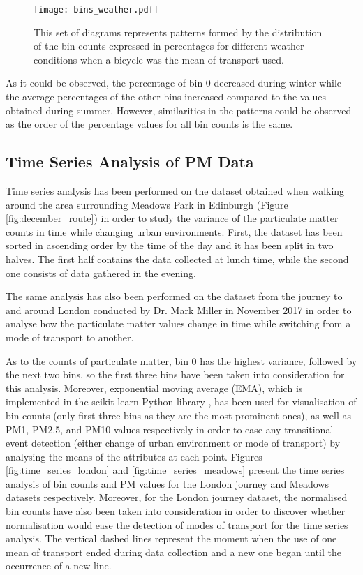 \documentclass[bsc,frontabs,twoside,singlespacing, parskip,deptreport]{infthesis}     %
\begin{document}
\begin{figure}[h!]
  \center
  \texttt{[image: bins\_weather.pdf]} 
  \caption{This set of diagrams represents patterns formed by the distribution of the bin counts expressed in percentages for different weather conditions when a bicycle was the mean of transport used.}
  \label{fig:bins_weather}
\end{figure}

As it could be observed, the percentage of bin 0 decreased during winter while the average percentages of the other bins increased compared to the values obtained during summer. However, similarities in the patterns could be observed as the order of the percentage values for all bin counts is the same.

\subsection{Time Series Analysis of PM Data}

Time series analysis has been performed on the dataset obtained when walking around the area surrounding Meadows Park in Edinburgh (Figure \ref{fig:december_route}) in order to study the variance of the particulate matter counts in time while changing urban environments. First, the dataset has been sorted in ascending order by the time of the day and it has been split in two halves. The first half contains the data collected at lunch time, while the second one consists of data gathered in the evening.

The same analysis has also been performed on the dataset from the journey to and around London conducted by Dr. Mark Miller in November 2017 in order to analyse how the particulate matter values change in time while switching from a mode of transport to another.

As to the counts of particulate matter, bin 0 has the highest variance, followed by the next two bins, so the first three bins have been taken into consideration for this analysis. Moreover, exponential moving average (EMA), which is implemented in the scikit-learn Python library \cite{scikit-learn}, has been used for visualisation of bin counts (only first three bins as they are the most prominent ones), as well as PM1, PM2.5, and PM10 values respectively in order to ease any transitional event detection (either change of urban environment or mode of transport) by analysing the means of the attributes at each point. Figures \ref{fig:time_series_london} and \ref{fig:time_series_meadows} present the time series analysis of bin counts and PM values for the London journey and Meadows datasets respectively. Moreover, for the London journey dataset, the normalised bin counts have also been taken into consideration in order to discover whether normalisation would ease the detection of modes of transport for the time series analysis. The vertical dashed lines represent the moment when the use of one mean of transport ended during data collection and a new one began until the occurrence of a new line.
\end{document}
